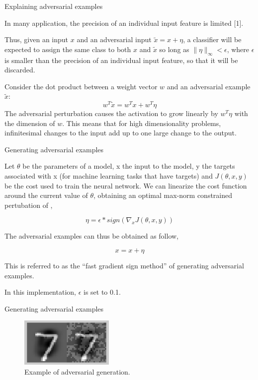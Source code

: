 \begin{tframe}{Explaining adversarial examples}

In many application, the precision of an individual input feature is limited [1].

\vspace{0.1in}

Thus, given an input $ x $ and an adversarial input $ \tilde{x} = x + \eta $, a classifier will be expected to assign the same class to both $x$ and $\tilde{x}$ so long as $ \parallel \eta \parallel_\infty < \epsilon $, where $\epsilon$ is smaller than the precision of an individual input feature, so that it will be discarded.

\vspace{0.1in}

Consider the dot product between a weight vector $w$ and an adversarial example $\tilde{x}$:
$$ w^{T}\tilde{x} = w^{T}x + w^{T}\eta $$
The adversarial perturbation causes the activation to grow linearly by $w^{T}\eta$ with the dimension of $w$. This means that for high dimensionality problems, infinitesimal changes to the input add up to one large change to the output.

\end{tframe}


\begin{tframe}{Generating adversarial examples}

Let $\theta$ be the parameters of a model, x the input to the model, y the targets associated with x (for machine learning tasks that have targets) and $J(\theta, x, y)$ be the cost used to train the neural network. 
We can linearize the cost function around the current value of $\theta$, obtaining an optimal max-norm constrained pertubation of ,

$$ \eta = \epsilon * sign(\nabla_x J(\theta, x, y)) $$

The adversarial examples can thus be obtained as follow,

$$ x = x + \eta $$

This is referred to as the “fast gradient sign method” of generating adversarial examples.

\vspace{0.1in}

In this implementation, $\epsilon$ is set to 0.1.


\end{tframe}


\begin{tframe}{Generating adversarial examples}

\vspace{0.1in}
\vspace{0.1in}
\vspace{0.1in}

\begin{figure}
  \includegraphics[width=0.4\textwidth]{img/clean-adv.png}
  \caption{Example of adversarial generation.}
\end{figure}

\end{tframe}